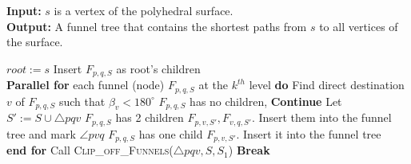 \begin{algorithm}[H]
\caption{Parallel Algorithm}
\textbf{Input:} $s$ is a vertex of the polyhedral surface. \\
\textbf{Output:} A funnel tree that contains the shortest paths from $s$ to all vertices of the surface.
\begin{algorithmic}[1]
\State $root := s$
    \State Insert $F_{p,q,S}$ as root's children
\EndFor
{} \\
    \hspace{0.25cm}\textbf{Parallel for} each funnel (node) $F_{p,q,S}$ at the $k^{th}$ level \textbf{do}
        \hspace{1cm}\State Find direct destination $v$ of $F_{p,q,S}$ such that $\beta_v < 180^\circ$ 
        \hspace{1cm}
            \hspace{1cm}\State $F_{p,q,S}$ has no children, \textbf{Continue}
        \hspace{1cm}\Else
            \hspace{1cm}\State Let $S' := S \cup \triangle pqv$
            \hspace{1cm}
                \hspace{1cm}\State $F_{p,q,S}$ has 2 children $F_{p,v,S'}, F_{v,q,S'}$. Insert them into the funnel tree and mark $\angle pvq$
            \hspace{1cm}\Else
                \hspace{1cm}\State $F_{p,q,S}$ has one child $F_{p,v,S'}$. Insert it into the funnel tree
            \hspace{1cm}\EndIf
        \hspace{1cm}\EndIf\\
    \hspace{0.25cm}\textbf{end for}
            \State Call \textsc{Clip\_off\_Funnels}($\triangle pqv, S, S_1$) 
        \EndIf
    \EndFor
        \State \textbf{Break}
    \EndIf
\EndFor
\end{algorithmic}
\end{algorithm}


